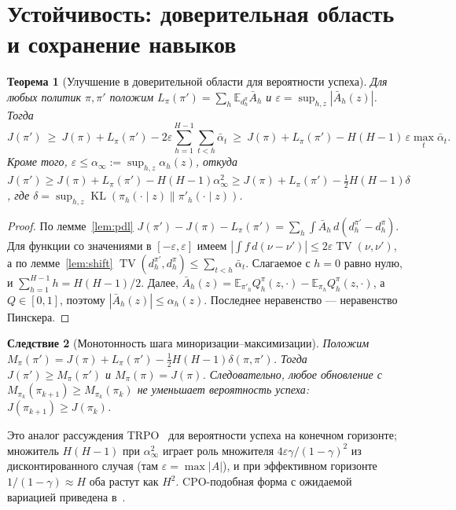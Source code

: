 \documentclass[11pt,a4paper]{article}
\theoremstyle{plain}
\newtheorem{theorem}{Теорема}[section]
\newtheorem{corollary}[theorem]{Следствие}
\theoremstyle{definition}
\theoremstyle{remark}
\newcommand{\E}{\mathbb{E}}
\DeclareMathOperator{\TV}{TV}
\DeclareMathOperator{\KL}{KL}
\newcommand{\ab}{\bar\alpha}
\begin{document}
\section{Устойчивость: доверительная область и сохранение навыков}\label{sec:stability}

\begin{theorem}[Улучшение в доверительной области для вероятности успеха]\label{thm:improve}
Для любых политик $\pi,\pi'$ положим $L_\pi(\pi')=\sum_h\E_{d^\pi_h}\bar A_h$ и $\varepsilon=\sup_{h,z}|\bar A_h(z)|$. Тогда
\begin{equation}\label{eq:improve}
J(\pi')\ \ge\ J(\pi)+L_\pi(\pi')-2\varepsilon\sum_{h=1}^{H-1}\sum_{t<h}\ab_t
\ \ge\ J(\pi)+L_\pi(\pi')-H(H-1)\,\varepsilon\max_t\ab_t .
\end{equation}
Кроме того, $\varepsilon\le\alpha_\infty:=\sup_{h,z}\alpha_h(z)$, откуда
$J(\pi')\ge J(\pi)+L_\pi(\pi')-H(H-1)\alpha_\infty^2\ge J(\pi)+L_\pi(\pi')-\tfrac12H(H-1)\delta$,
где $\delta=\sup_{h,z}\KL(\pi_h(\cdot\mid z)\|\pi'_h(\cdot\mid z))$.
\end{theorem}
\begin{proof}
По лемме~\ref{lem:pdl} $J(\pi')-J(\pi)-L_\pi(\pi')=\sum_h\int\bar A_h\,d(d^{\pi'}_h-d^\pi_h)$. Для функции со значениями в $[-\varepsilon,\varepsilon]$ имеем $|\int f\,d(\nu-\nu')|\le2\varepsilon\TV(\nu,\nu')$, а по лемме~\ref{lem:shift} $\TV(d^{\pi'}_h,d^\pi_h)\le\sum_{t<h}\ab_t$. Слагаемое с $h=0$ равно нулю, и $\sum_{h=1}^{H-1}h=H(H-1)/2$. Далее, $\bar A_h(z)=\E_{\pi'_h}Q^\pi_h(z,\cdot)-\E_{\pi_h}Q^\pi_h(z,\cdot)$, а $Q\in[0,1]$, поэтому $|\bar A_h(z)|\le\alpha_h(z)$. Последнее неравенство --- неравенство Пинскера.
\end{proof}

\begin{corollary}[Монотонность шага миноризации--максимизации]\label{cor:mm}
Положим $M_\pi(\pi')=J(\pi)+L_\pi(\pi')-\tfrac12H(H-1)\delta(\pi,\pi')$. Тогда $J(\pi')\ge M_\pi(\pi')$ и $M_\pi(\pi)=J(\pi)$. Следовательно, любое обновление с $M_{\pi_k}(\pi_{k+1})\ge M_{\pi_k}(\pi_k)$ не уменьшает вероятность успеха: $J(\pi_{k+1})\ge J(\pi_k)$.
\end{corollary}

Это аналог рассуждения TRPO~\cite{trpo} для вероятности успеха на конечном горизонте; множитель $H(H-1)$ при $\alpha_\infty^2$ играет роль множителя $4\varepsilon\gamma/(1-\gamma)^2$ из дисконтированного случая (там $\varepsilon=\max|A|$), и при эффективном горизонте $1/(1-\gamma)\approx H$ оба растут как $H^2$. CPO-подобная форма с ожидаемой вариацией приведена в~\cite{cpo}.
\end{document}
